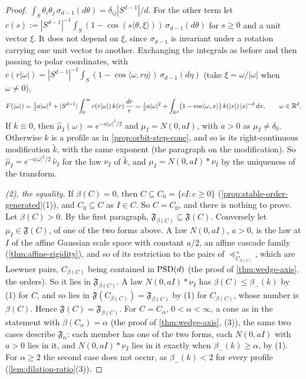 \begin{proof}
$\int_S\theta_i\theta_j\,\sigma_{d-1}(d\theta) = \delta_{ij}|S^{d-1}|/d$. For the other term let
$c(s) := |S^{d-1}|^{-1}\int_S(1 - \cos(s\langle\theta,\xi\rangle))\,\sigma_{d-1}(d\theta)$ for $s \ge 0$ and a unit vector $\xi$. It does not depend on $\xi$, since $\sigma_{d-1}$ is invariant under a rotation carrying one unit vector to
another. Exchanging the integrals as before and then passing to polar coordinates, with
$c(r|\omega|) = |S^{d-1}|^{-1}\int_S(1 - \cos\langle\omega, r\eta\rangle)\,\sigma_{d-1}(d\eta)$ (take $\xi = \omega/|\omega|$
when $\omega \ne 0$),
\[
  F(|\omega|) = \tfrac12 a|\omega|^2 + |S^{d-1}|\int_0^\infty c(r|\omega|)\,k(r)\,\frac{dr}{r}
  = \tfrac12 a|\omega|^2 + \int_{\mathbb{R}^d}\bigl(1 - \cos\langle\omega,x\rangle\bigr)\,k(|x|)\,|x|^{-d}\,dx ,
  \qquad \omega \in \mathbb{R}^d .
\]
If $k \equiv 0$, then $\widehat\mu_I(\omega) = e^{-a|\omega|^2/2}$ and
$\mu_I = N(0, aI)$, with $a > 0$ as $\mu_I \ne \delta_0$. Otherwise $k$ is a profile as in
\ref{prop:orbit-step-cone}, and so is its right-continuous modification $\tilde k$, with the same exponent (the paragraph
on the modification). So $\widehat\mu_I = e^{-a|\omega|^2/2}\,\widehat\nu_I$ for the law $\nu_I$ of $\tilde k$, and
$\mu_I = N(0, aI) * \nu_I$ by the uniqueness of the transform.

\emph{(2), the equality.} If $\beta(C) = 0$, then $C \subseteq C_0 = \{cI : c \ge 0\}$
(\ref{prop:stable-order-generated}(1)), and $C_0 \subseteq C$ as $I \in C$. So $C = C_0$, and there is nothing to prove. Let $\beta(C) > 0$. By the first paragraph, $\mathfrak F_{\beta(C)} \subseteq \mathfrak F(C)$.
Conversely let $\mu_I \in \mathfrak F(C)$, of one of the two forms above. A law $N(0, aI)$, $a > 0$, is the law
at $I$ of the affine Gaussian scale space with constant $a/2$, an affine cascade family
(\ref{thm:affine-rigidity}), and so of its restriction to the pairs of $\preceq^+_{C_{\beta(C)}}$, which are
Loewner pairs, $C_{\beta(C)}$ being contained in $\mathrm{PSD}(d)$ (the proof of \ref{thm:wedge-axis}, the orders). So it lies in $\mathfrak F_{\beta(C)}$. A law $N(0, aI) * \nu_I$ has $\beta(C) \le \beta_-(k)$ by (1) for $C$, and so
lies in $\mathfrak F(C_{\beta(C)}) = \mathfrak F_{\beta(C)}$ by (1) for $C_{\beta(C)}$, whose number is $\beta(C)$. Hence
$\mathfrak F(C) = \mathfrak F_{\beta(C)}$. For $C = C_\alpha$, $0 < \alpha < \infty$, a cone as in the statement with
$\beta(C_\alpha) = \alpha$ (the proof of \ref{thm:wedge-axis}, (3)), the same two cases describe
$\mathfrak F_\alpha$: each member has one of the two forms, each $N(0, aI)$ with $a > 0$ lies in it, and
$N(0, aI) * \nu_I$ lies in it exactly when $\beta_-(k) \ge \alpha$, by (1). For $\alpha \ge 2$ the second case does
not occur, as $\beta_-(k) < 2$ for every profile (\ref{lem:dilation-ratio}(3)).
\end{proof}
